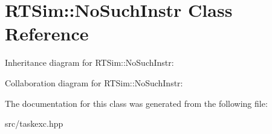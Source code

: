 \hypertarget{classRTSim_1_1NoSuchInstr}{}\section{R\+T\+Sim\+:\+:No\+Such\+Instr Class Reference}
\label{classRTSim_1_1NoSuchInstr}


Inheritance diagram for R\+T\+Sim\+:\+:No\+Such\+Instr\+:


Collaboration diagram for R\+T\+Sim\+:\+:No\+Such\+Instr\+:


The documentation for this class was generated from the following file\+:\begin{DoxyCompactItemize}
\item 
src/taskexc.\+hpp\end{DoxyCompactItemize}
